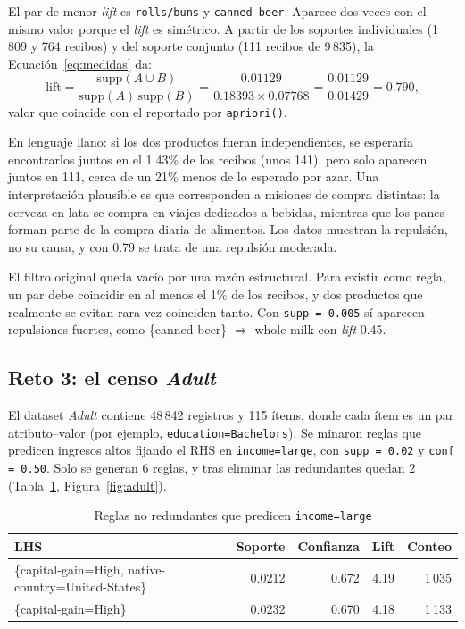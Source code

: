\documentclass[11pt,a4paper]{article}
\begin{document}
El par de menor \emph{lift} es \texttt{rolls/buns} y \texttt{canned beer}. Aparece dos veces
con el mismo valor porque el \emph{lift} es simétrico. A partir de los soportes individuales
(1\,809 y 764 recibos) y del soporte conjunto (111 recibos de 9\,835), la
Ecuación~\ref{eq:medidas} da:
\begin{equation}
  \text{lift} = \frac{\text{supp}(A \cup B)}{\text{supp}(A)\,\text{supp}(B)}
  = \frac{0.01129}{0.18393 \times 0.07768} = \frac{0.01129}{0.01429} = 0.790,
\end{equation}
valor que coincide con el reportado por \texttt{apriori()}.

En lenguaje llano: si los dos productos fueran independientes, se esperaría encontrarlos
juntos en el 1.43\% de los recibos (unos 141), pero solo aparecen juntos en 111, cerca de un
21\% menos de lo esperado por azar. Una interpretación plausible es que corresponden a
misiones de compra distintas: la cerveza en lata se compra en viajes dedicados a bebidas,
mientras que los panes forman parte de la compra diaria de alimentos. Los datos muestran la
repulsión, no su causa, y con 0.79 se trata de una repulsión moderada.

El filtro original queda vacío por una razón estructural. Para existir como regla, un par
debe coincidir en al menos el 1\% de los recibos, y dos productos que realmente se evitan
rara vez coinciden tanto. Con \texttt{supp = 0.005} sí aparecen repulsiones fuertes, como
\{canned beer\} $\Rightarrow$ whole milk con \emph{lift} 0.45.

\subsection{Reto 3: el censo \emph{Adult}}

El dataset \emph{Adult} contiene 48\,842 registros y 115 ítems, donde cada ítem es un par
atributo--valor (por ejemplo, \texttt{education=Bachelors}). Se minaron reglas que predicen
ingresos altos fijando el RHS en \texttt{income=large}, con \texttt{supp = 0.02} y
\texttt{conf = 0.50}. Solo se generan 6 reglas, y tras eliminar las redundantes quedan 2
(Tabla~\ref{tab:adult}, Figura~\ref{fig:adult}).

\begin{table}[H]
  \centering
  \caption{Reglas no redundantes que predicen \texttt{income=large}}
  \label{tab:adult}
  \small
  \begin{tabular}{lrrrr}
    \toprule
    LHS & Soporte & Confianza & Lift & Conteo \\
    \midrule
    \{capital-gain=High, native-country=United-States\} & 0.0212 & 0.672 & 4.19 & 1\,035 \\
    \{capital-gain=High\} & 0.0232 & 0.670 & 4.18 & 1\,133 \\
    \bottomrule
  \end{tabular}
\end{table}
\end{document}
